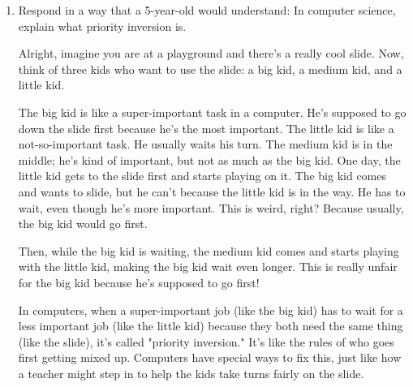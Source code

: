 \documentclass{article}
\newenvironment{QandA}{\begin{enumerate}[label=\bfseries\alph*.]\bfseries}
                      {\end{enumerate}}
\newenvironment{answered}{\par\normalfont}{}
\begin{document}
\begin{QandA}
\begin{answered}
Other Techniques: Include using non-blocking algorithms or designing systems where priority inversion is less likely to occur.

Importance in Computing:
Priority inversion is a critical issue in systems where timing and task prioritization are essential, such as in embedded systems, real-time operating systems, and critical infrastructure management. Managing and mitigating priority inversion is crucial for ensuring the reliability and predictability of these systems.
         \end{answered}

   \item Respond in a way that a 5-year-old would understand: In computer science, explain what priority inversion is.
         \begin{answered}
         Alright, imagine you are at a playground and there's a really cool slide. Now, think of three kids who want to use the slide: a big kid, a medium kid, and a little kid.

The big kid is like a super-important task in a computer. He's supposed to go down the slide first because he's the most important.
The little kid is like a not-so-important task. He usually waits his turn.
The medium kid is in the middle; he's kind of important, but not as much as the big kid.
One day, the little kid gets to the slide first and starts playing on it. The big kid comes and wants to slide, but he can't because the little kid is in the way. He has to wait, even though he's more important. This is weird, right? Because usually, the big kid would go first.

Then, while the big kid is waiting, the medium kid comes and starts playing with the little kid, making the big kid wait even longer. This is really unfair for the big kid because he's supposed to go first!

In computers, when a super-important job (like the big kid) has to wait for a less important job (like the little kid) because they both need the same thing (like the slide), it's called "priority inversion." It's like the rules of who goes first getting mixed up. Computers have special ways to fix this, just like how a teacher might step in to help the kids take turns fairly on the slide.
         \end{answered}
\end{QandA}
\end{document}

